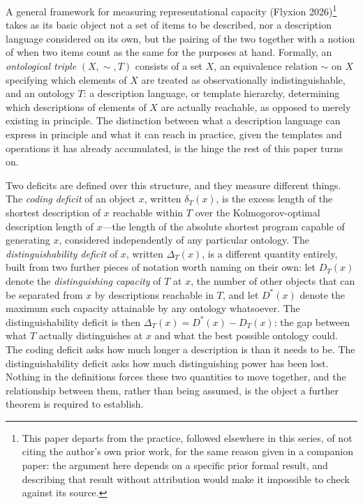 \documentclass[11pt]{article}
\theoremstyle{plain}
\begin{document}
A general framework for measuring representational capacity (Flyxion 2026)\footnote{This paper departs from the practice, followed elsewhere in this series, of not citing the author's own prior work, for the same reason given in a companion paper: the argument here depends on a specific prior formal result, and describing that result without attribution would make it impossible to check against its source.} takes as its basic object not a set of items to be described, nor a description language considered on its own, but the pairing of the two together with a notion of when two items count as the same for the purposes at hand. Formally, an \emph{ontological triple} $(X,\sim,T)$ consists of a set $X$, an equivalence relation $\sim$ on $X$ specifying which elements of $X$ are treated as observationally indistinguishable, and an ontology $T$: a description language, or template hierarchy, determining which descriptions of elements of $X$ are actually reachable, as opposed to merely existing in principle. The distinction between what a description language can express in principle and what it can reach in practice, given the templates and operations it has already accumulated, is the hinge the rest of this paper turns on.

Two deficits are defined over this structure, and they measure different things. The \emph{coding deficit} of an object $x$, written $\delta_T(x)$, is the excess length of the shortest description of $x$ reachable within $T$ over the Kolmogorov-optimal description length of $x$---the length of the absolute shortest program capable of generating $x$, considered independently of any particular ontology. The \emph{distinguishability deficit} of $x$, written $\Delta_T(x)$, is a different quantity entirely, built from two further pieces of notation worth naming on their own: let $D_T(x)$ denote the \emph{distinguishing capacity} of $T$ at $x$, the number of other objects that can be separated from $x$ by descriptions reachable in $T$, and let $D^*(x)$ denote the maximum such capacity attainable by any ontology whatsoever. The distinguishability deficit is then $\Delta_T(x) = D^*(x) - D_T(x)$: the gap between what $T$ actually distinguishes at $x$ and what the best possible ontology could. The coding deficit asks how much longer a description is than it needs to be. The distinguishability deficit asks how much distinguishing power has been lost. Nothing in the definitions forces these two quantities to move together, and the relationship between them, rather than being assumed, is the object a further theorem is required to establish.
\end{document}
